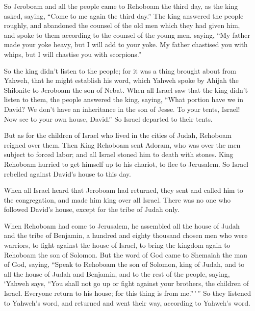  So Jeroboam and all the people came to Rehoboam the
third day, as the king asked, saying, ``Come to me again the third
day.''  The king answered the people roughly, and
abandoned the counsel of the old men which they had given him,
 and spoke to them according to the counsel of the young
men, saying, ``My father made your yoke heavy, but I will add to your
yoke. My father chastised you with whips, but I will chastise you with
scorpions.''

 So the king didn't listen to the people; for it was a
thing brought about from Yahweh, that he might establish his word, which
Yahweh spoke by Ahijah the Shilonite to Jeroboam the son of Nebat.
 When all Israel saw that the king didn't listen to them,
the people answered the king, saying, ``What portion have we in David?
We don't have an inheritance in the son of Jesse. To your tents, Israel!
Now see to your own house, David.'' So Israel departed to their tents.

 But as for the children of Israel who lived in the
cities of Judah, Rehoboam reigned over them.  Then King
Rehoboam sent Adoram, who was over the men subject to forced labor; and
all Israel stoned him to death with stones. King Rehoboam hurried to get
himself up to his chariot, to flee to Jerusalem.  So
Israel rebelled against David's house to this day.

 When all Israel heard that Jeroboam had returned, they
sent and called him to the congregation, and made him king over all
Israel. There was no one who followed David's house, except for the
tribe of Judah only.

 When Rehoboam had come to Jerusalem, he assembled all
the house of Judah and the tribe of Benjamin, a hundred and eighty
thousand chosen men who were warriors, to fight against the house of
Israel, to bring the kingdom again to Rehoboam the son of Solomon.
 But the word of God came to Shemaiah the man of God,
saying,  ``Speak to Rehoboam the son of Solomon, king of
Judah, and to all the house of Judah and Benjamin, and to the rest of
the people, saying,  `Yahweh says, ``You shall not go up
or fight against your brothers, the children of Israel. Everyone return
to his house; for this thing is from me.''\,'\,'' So they listened to
Yahweh's word, and returned and went their way, according to Yahweh's
word.

